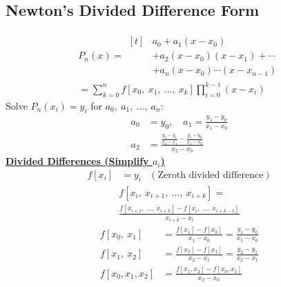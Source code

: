 \documentclass{article}
\begin{document}
\begin{multicols}{3}
    \subsection{Newton's Divided Difference Form}
    \begin{multline*}
        P_n\left( x \right) = \begin{aligned}[t]
             & a_0 + a_1 \left( x - x_0 \right)                                 \\
             & + a_2 \left( x - x_0 \right) \left( x - x_1 \right) + \cdots     \\
             & + a_n \left( x - x_0 \right) \cdots \left( x - x_{n - 1} \right)
        \end{aligned} \\
        = \sum_{k = 0}^n f\left[ x_0,\: x_1,\: \dots,\: x_k \right] \prod_{i = 0}^{k - 1} \left( x - x_i \right)
    \end{multline*}
    Solve \(P_n\left( x_i \right) = y_i\) for \(a_0,\: a_1,\: \dots,\: a_n\):
    \begin{align*}
        a_0 & = y_0, \quad a_1 = \frac{y_1 - y_0}{x_1 - x_0}                                \\
        a_2 & = \frac{\frac{y_2 - y_1}{x_2 - x_1} - \frac{y_1 - y_0}{x_1 - x_0}}{x_2 - x_0}
    \end{align*}
    \underline{\textbf{Divided Differences (Simplify \(a_i\))}}
    \begin{align*}
        f\left[ x_i \right] & = y_i & (\text{Zeroth divided difference})
    \end{align*}
    \begin{multline*}
        f\left[ x_i,\: x_{i + 1},\: \dots,\: x_{i + k} \right] = \\
        \frac{f\left[ x_{i + 1},\: \dots,\: x_{i + k} \right] - f\left[ x_i,\: \dots,\: x_{i + k - 1} \right]}{x_{i + k} - x_i}
    \end{multline*}
    \begin{align*}
        f\left[ x_0,\: x_1 \right]    & = \frac{f\left[ x_1 \right] - f\left[ x_0 \right]}{x_1 - x_0} = \frac{y_1 - y_0}{x_1 - x_0} \\
        f\left[ x_1,\: x_2 \right]    & = \frac{f\left[ x_2 \right] - f\left[ x_1 \right]}{x_2 - x_1} = \frac{y_2 - y_1}{x_2 - x_1} \\
        f\left[ x_0, x_1, x_2 \right] & = \frac{f\left[ x_1, x_2 \right] - f\left[ x_0, x_1 \right]}{x_2 - x_0}
    \end{align*}

\end{multicols}
\end{document}

